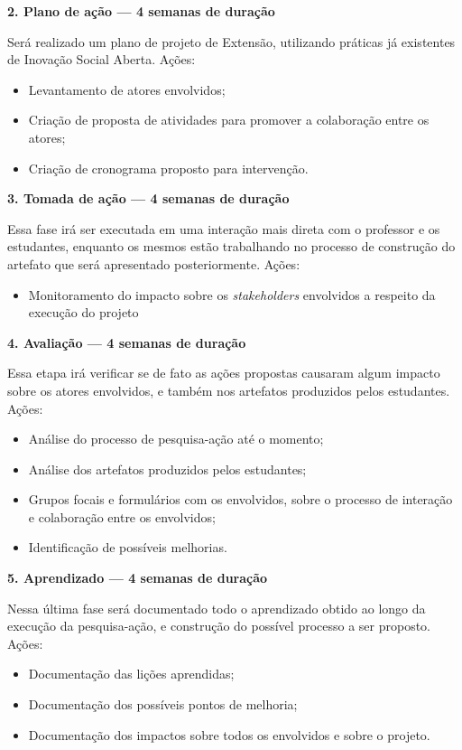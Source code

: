 \textbf{2. Plano de ação — 4 semanas de duração}

Será realizado um plano de projeto de Extensão, utilizando práticas já existentes de Inovação Social Aberta. 
Ações:
\begin{itemize}
    \item Levantamento de atores envolvidos;
    \item Criação de proposta de atividades para promover a colaboração entre os atores;
    \item Criação de cronograma proposto para intervenção.
\par\vspace{1\baselineskip}

\end{itemize}

\textbf{3. Tomada de ação —  4 semanas de duração}

Essa fase irá ser executada em uma interação mais direta com o professor e os estudantes, enquanto os mesmos estão trabalhando no processo de construção do artefato que será apresentado posteriormente. Ações:
\begin{itemize}
    \item Monitoramento do impacto sobre os \textit{stakeholders} envolvidos a respeito da execução do projeto
\par\vspace{1\baselineskip}

\end{itemize}

\textbf{4. Avaliação — 4 semanas de duração}

Essa etapa irá verificar se de fato as ações propostas causaram algum impacto sobre os atores envolvidos, e também nos artefatos produzidos pelos estudantes. Ações:
\begin{itemize}
    \item Análise do processo de pesquisa-ação até o momento;
    \item Análise dos artefatos produzidos pelos estudantes;
    \item Grupos focais e formulários com os envolvidos, sobre o processo de interação e colaboração entre os envolvidos;
    \item Identificação de possíveis melhorias.
\par\vspace{1\baselineskip}

\end{itemize}

\textbf{5. Aprendizado — 4 semanas de duração}

Nessa última fase será documentado todo o aprendizado obtido ao longo da execução da pesquisa-ação, e construção do possível processo a ser proposto. Ações:
\begin{itemize}
    \item Documentação das lições aprendidas;
    \item Documentação dos possíveis pontos de melhoria;
    \item Documentação dos impactos sobre todos os envolvidos e sobre o projeto.
\end{itemize}

